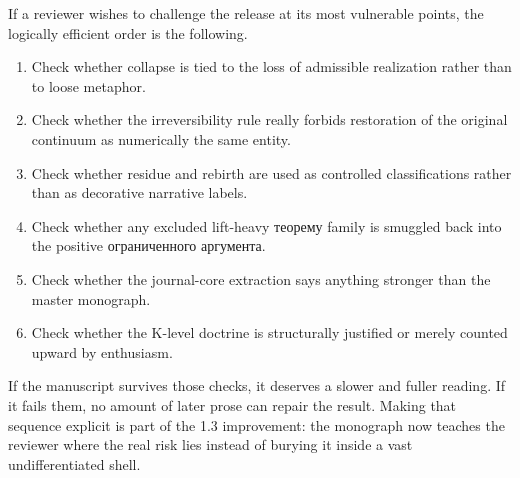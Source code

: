 If a reviewer wishes to challenge the release at its most vulnerable points, the logically
efficient order is the following.

\begin{enumerate}
\item Check whether collapse is tied to the loss of admissible realization rather than to loose
      metaphor.
\item Check whether the irreversibility rule really forbids restoration of the original
      continuum as numerically the same entity.
\item Check whether residue and rebirth are used as controlled classifications rather than as
      decorative narrative labels.
\item Check whether any excluded lift-heavy теорему family is smuggled back into the positive
      ограниченного аргумента.
\item Check whether the journal-core extraction says anything stronger than the master monograph.
\item Check whether the K-level doctrine is structurally justified or merely counted upward by
      enthusiasm.
\end{enumerate}

If the manuscript survives those checks, it deserves a slower and fuller reading. If it fails
them, no amount of later prose can repair the result. Making that sequence explicit is part of
the 1.3 improvement: the monograph now teaches the reviewer where the real risk lies instead of
burying it inside a vast undifferentiated shell.

\clearpage
